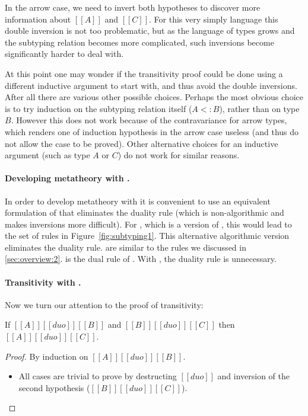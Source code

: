 \noindent In the arrow case, we need to invert both hypotheses to discover more information about $[[A]]$ and $[[C]]$.
For this very simply language this double inversion is not too problematic, but as the language
of types grows and the subtyping relation becomes more complicated, such inversions become
significantly harder to deal with.

At this point one may wonder if the transitivity proof could be done
using a different inductive argument to start with, and thus avoid the
double inversions.  After all there are various other possible
choices. Perhaps the most obvious choice is to try induction on the
subtyping relation itself ($A <: B$), rather than on type $B$. However
this does not work because of the contravariance for arrow types, which
renders one of induction hypothesis in the arrow case useless
(and thus do not allow the case to be proved). Other alternative choices
for an inductive argument (such as type $A$ or $C$) do not work for similar
reasons.

\paragraph{Developing metatheory with \nameduo.} In order to develop metatheory
with \nameduo it is convenient to use an equivalent formulation of \nameduo that
eliminates the duality rule (which is non-algorithmic and makes inversions more difficult).
For \gstlc, which
is a \nameduo version of \stlc, this would lead to the set of rules in Figure~\ref{fig:subtyping1}.
This alternative algorithmic version eliminates the duality rule.
 are similar to the rules we discussed in \cref{sec:overview:2}.
 is the dual rule of . With
, the duality rule is unnecessary.

\paragraph{Transitivity with \nameduo.} Now we turn our attention to the proof of transitivity:

\begin{lemma}
\label{gstlc:trans1}
   If $[[A]] [[duo]] [[B]]$ and $[[B]] [[duo]] [[C]]$ then $[[A]] [[duo]] [[C]]$.
\end{lemma}
 
\begin{proof}
By induction on $[[A]] [[duo]] [[B]]$. 
\begin{itemize}
  \item{All cases are trivial to prove by destructing $[[duo]]$ and inversion of the second hypothesis ($[[B]] [[duo]] [[C]]$).}
\end{itemize}
\end{proof}

